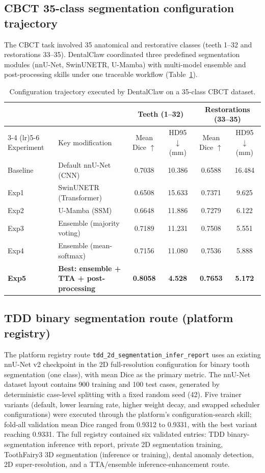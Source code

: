 \documentclass[final,5p,times,twocolumn]{elsarticle}
\begin{document}
\subsection{CBCT 35-class segmentation configuration trajectory}

The CBCT task involved 35 anatomical and restorative classes (teeth 1--32 and restorations 33--35). DentalClaw coordinated three predefined segmentation modules (nnU-Net, SwinUNETR, U-Mamba) with multi-model ensemble and post-processing skills under one traceable workflow (Table~\ref{tab:supp_cbct_trajectory}).

\begin{table}[!ht]
\centering
\small
\caption{Configuration trajectory executed by DentalClaw on a 35-class CBCT dataset.}
\label{tab:supp_cbct_trajectory}
\begin{tabular}{l l c c c c}
\toprule
& & \multicolumn{2}{c}{Teeth (1--32)} & \multicolumn{2}{c}{Restorations (33--35)} \\
\cmidrule(lr){3-4} \cmidrule(lr){5-6}
Experiment & Key modification & Mean Dice $\uparrow$ & HD95 $\downarrow$ (mm) & Mean Dice $\uparrow$ & HD95 $\downarrow$ (mm) \\
\midrule
Baseline & Default nnU-Net (CNN) & 0.7038 & 10.386 & 0.6588 & 16.484 \\
Exp1 & SwinUNETR (Transformer) & 0.6508 & 15.633 & 0.7371 & 9.625 \\
Exp2 & U-Mamba (SSM) & 0.6648 & 11.886 & 0.7279 & 6.122 \\
Exp3 & Ensemble (majority voting) & 0.7189 & 11.231 & 0.7508 & 5.551 \\
Exp4 & Ensemble (mean-softmax) & 0.7156 & 11.080 & 0.7536 & 5.888 \\
\textbf{Exp5} & \textbf{Best: ensemble + TTA + post-processing} & \textbf{0.8058} & \textbf{4.528} & \textbf{0.7653} & \textbf{5.172} \\
\bottomrule
\end{tabular}
\end{table}

\subsection{TDD binary segmentation route (platform registry)}

The platform registry route \texttt{tdd\_2d\_segmentation\_infer\_report} uses an existing nnU-Net v2 checkpoint in the 2D full-resolution configuration for binary tooth segmentation (one class), with mean Dice as the primary metric. The nnU-Net dataset layout contains 900 training and 100 test cases, generated by deterministic case-level splitting with a fixed random seed (42). Five trainer variants (default, lower learning rate, higher weight decay, and swapped scheduler configurations) were executed through the platform's configuration-search skill; fold-all validation mean Dice ranged from 0.9312 to 0.9331, with the best variant reaching 0.9331. The full registry contained six validated entries: TDD binary-segmentation inference with report, private 2D segmentation training, ToothFairy3 3D segmentation (inference or training), dental anomaly detection, 2D super-resolution, and a TTA/ensemble inference-enhancement route.
\end{document}
